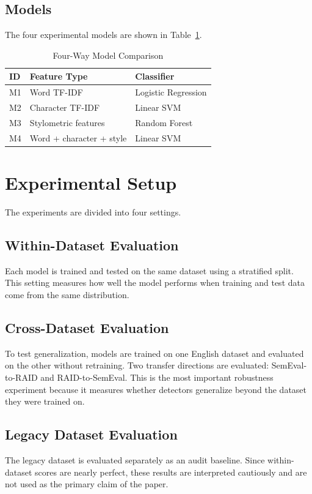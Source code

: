 \documentclass[conference]{IEEEtran}
\begin{document}
\subsection{Models}
The four experimental models are shown in Table~\ref{tab:models}.

\begin{table}[htbp]
\caption{Four-Way Model Comparison}
\centering
\begin{tabular}{lll}
\toprule
ID & Feature Type & Classifier \\
\midrule
M1 & Word TF-IDF & Logistic Regression \\
M2 & Character TF-IDF & Linear SVM \\
M3 & Stylometric features & Random Forest \\
M4 & Word + character + style & Linear SVM \\
\bottomrule
\end{tabular}
\label{tab:models}
\end{table}

\section{Experimental Setup}

The experiments are divided into four settings.

\subsection{Within-Dataset Evaluation}
Each model is trained and tested on the same dataset using a stratified split. This setting measures how well the model performs when training and test data come from the same distribution.

\subsection{Cross-Dataset Evaluation}
To test generalization, models are trained on one English dataset and evaluated on the other without retraining. Two transfer directions are evaluated: SemEval-to-RAID and RAID-to-SemEval. This is the most important robustness experiment because it measures whether detectors generalize beyond the dataset they were trained on.

\subsection{Legacy Dataset Evaluation}
The legacy dataset is evaluated separately as an audit baseline. Since within-dataset scores are nearly perfect, these results are interpreted cautiously and are not used as the primary claim of the paper.
\end{document}
